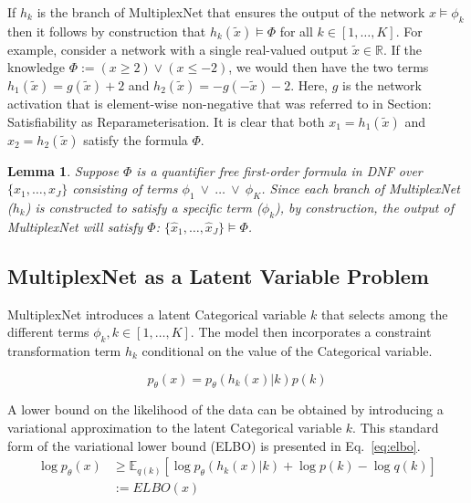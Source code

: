 \documentclass[letterpaper]{article} %
\newcommand{\E}{\mathbb{E}}
\newtheorem{lemma}[theorem]{Lemma}
\begin{document}
If $h_k$ is the branch of MultiplexNet that ensures the output of the network $x \models \phi_k$ then it follows by construction that $h_k(\tilde{x})\models \Phi$ for all $k \in [1, \dots, K]$.
For example, consider a network with a single real-valued output $\tilde{x} \in \mathbb{R}$.
If the knowledge $\Phi := (x \geq 2) \lor (x \leq -2)$, we would then have the two terms $h_1(\tilde{x}) = g(\tilde{x}) + 2$ and $h_2(\tilde{x}) = -g(-\tilde{x}) - 2$.
Here, $g$ is the network activation that is element-wise non-negative that was referred to in Section: Satisfiability as Reparameterisation.
It is clear that both $x_1 = h_1(\tilde{x})$ and $x_2 = h_2(\tilde{x})$ satisfy the formula $\Phi$.

\begin{lemma}
Suppose $\Phi$ is a quantifier free first-order formula in DNF over $\{x_1,\dots,x_J\}$ consisting of terms $\phi_1~\lor~\dots~\lor~\phi_K$.
Since each branch of MultiplexNet ($h_k$) is constructed to satisfy a specific term ($\phi_k$), by construction, the output of MultiplexNet will satisfy $\Phi$: $\{\hat{x}_1,\dots,\hat{x}_J\} \models \Phi$.
\end{lemma}

\subsection{MultiplexNet as a Latent Variable Problem}

MultiplexNet introduces a latent Categorical variable $k$ that selects among the different terms $\phi_k, k \in [1, \dots, K]$.
The model then incorporates a constraint transformation term $h_k$ conditional on the value of the Categorical variable.

\begin{equation}
    \label{eq:introduce_latent_categorical_variable}
    p_\theta(x) = p_\theta(h_k(x) | k)p(k)
\end{equation}

A lower bound on the likelihood of the data can be obtained by introducing a variational approximation to the latent Categorical variable $k$.
This standard form of the variational lower bound (ELBO) is presented in Eq.~\ref{eq:elbo}.
\begin{equation}
    \begin{split}
        \label{eq:elbo}
        \log p_\theta (x) &\geq  \E_{q(k)}[\log p_\theta(h_k(x) | k) + \log p(k) - \log q(k)] \\
        &:= ELBO(x)
    \end{split}
\end{equation}
\end{document}
